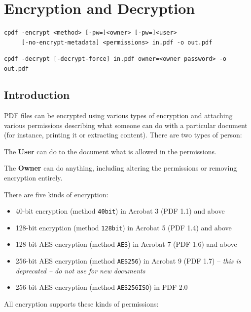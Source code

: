 \documentclass{book}
\begin{document}
\chapter{Encryption and Decryption}\label{chap:4}
\pagestyle{fancy}
\label{encryption}
  \begin{framed}
    \small\noindent\verb!cpdf -encrypt <method> [-pw=]<owner> [-pw=]<user>!\\
    \noindent\verb!     [-no-encrypt-metadata] <permissions> in.pdf -o out.pdf!

    \vspace{1.5mm}
    \noindent\verb!cpdf -decrypt [-decrypt-force] in.pdf owner=<owner password> -o out.pdf!
  \end{framed}
  \label{crypt}
  \section{Introduction}
  PDF files can be encrypted using various types of encryption and attaching
various permissions describing what someone can do with a particular document
(for instance, printing it or extracting content). There are two types of
person:
  \begin{description}
    \item The \textbf{User} can do to the document what is allowed in the permissions.
    \item The \textbf{Owner} can do anything, including altering the permissions or removing encryption entirely.
  \end{description}
  There are five kinds of encryption:
  \begin{itemize}
  \item 40-bit encryption (method \texttt{40bit}) in Acrobat 3 (PDF 1.1) and above
  \item 128-bit encryption (method \texttt{128bit}) in Acrobat 5 (PDF 1.4) and above
  \item 128-bit AES encryption (method \texttt{AES}) in Acrobat 7 (PDF 1.6) and above
  \item 256-bit AES encryption (method \texttt{AES256}) in Acrobat 9 (PDF 1.7) -- \textit{this is deprecated -- do not use for new documents}
  \item 256-bit AES encryption (method \texttt{AES256ISO}) in PDF 2.0
  \end{itemize}

   \vspace{2mm}
   \noindent All encryption supports these kinds of permissions:
\end{document}
